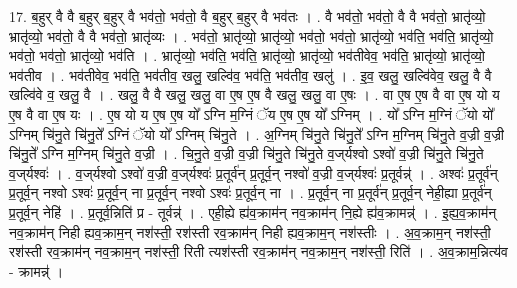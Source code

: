 \documentclass[17pt]{extarticle}
\begin{document}
17. ब॒हुर् वै वै ब॒हुर् ब॒हुर् वै भव॑तो॒ भव॑तो॒ वै ब॒हुर् ब॒हुर् वै भव॑तः । . वै भव॑तो॒ भव॑तो॒ वै वै भव॑तो॒ भ्रातृ॑व्यो॒ भ्रातृ॑व्यो॒ भव॑तो॒ वै वै भव॑तो॒ भ्रातृ॑व्यः । . भव॑तो॒ भ्रातृ॑व्यो॒ भ्रातृ॑व्यो॒ भव॑तो॒ भव॑तो॒ भ्रातृ॑व्यो॒ भव॑ति॒ भव॑ति॒ भ्रातृ॑व्यो॒ भव॑तो॒ भव॑तो॒ भ्रातृ॑व्यो॒ भव॑ति । . भ्रातृ॑व्यो॒ भव॑ति॒ भव॑ति॒ भ्रातृ॑व्यो॒ भ्रातृ॑व्यो॒ भव॑तीवेव॒ भव॑ति॒ भ्रातृ॑व्यो॒ भ्रातृ॑व्यो॒ भव॑तीव । . भव॑तीवेव॒ भव॑ति॒ भव॑तीव॒ खलु॒ खल्वि॑व॒ भव॑ति॒ भव॑तीव॒ खलु॑ । . इ॒व॒ खलु॒ खल्वि॑वेव॒ खलु॒ वै वै खल्वि॑वे व॒ खलु॒ वै । . खलु॒ वै वै खलु॒ खलु॒ वा ए॒ष ए॒ष वै खलु॒ खलु॒ वा ए॒षः । . वा ए॒ष ए॒ष वै वा ए॒ष यो य ए॒ष वै वा ए॒ष यः । . ए॒ष यो य ए॒ष ए॒ष यो᳚ ऽग्नि म॒ग्निं ॅय ए॒ष ए॒ष यो᳚ ऽग्निम् । . यो᳚ ऽग्नि म॒ग्निं ॅयो यो᳚ ऽग्निम् चि॑नु॒ते चि॑नु॒ते᳚ ऽग्निं ॅयो यो᳚ ऽग्निम् चि॑नु॒ते । . अ॒ग्निम् चि॑नु॒ते चि॑नु॒ते᳚ ऽग्नि म॒ग्निम् चि॑नु॒ते व॒ज्री व॒ज्री चि॑नु॒ते᳚ ऽग्नि म॒ग्निम् चि॑नु॒ते व॒ज्री । . चि॒नु॒ते व॒ज्री व॒ज्री चि॑नु॒ते चि॑नु॒ते व॒ज्‌र्यश्वो ऽश्वो॑ व॒ज्री चि॑नु॒ते चि॑नु॒ते व॒ज्‌र्यश्वः॑ । . व॒ज्‌र्यश्वो ऽश्वो॑ व॒ज्री व॒ज्‌र्यश्वः॑ प्र॒तूर्व॑न् प्र॒तूर्व॒न् नश्वो॑ व॒ज्री व॒ज्‌र्यश्वः॑ प्र॒तूर्वन्न्॑ । . अश्वः॑ प्र॒तूर्व॑न् प्र॒तूर्व॒न् नश्वो ऽश्वः॑ प्र॒तूर्व॒न् ना प्र॒तूर्व॒न् नश्वो ऽश्वः॑ प्र॒तूर्व॒न् ना । . प्र॒तूर्व॒न् ना प्र॒तूर्व॑न् प्र॒तूर्व॒न् नेही॒ह्या प्र॒तूर्व॑न् प्र॒तूर्व॒न् नेहि॑ । . प्र॒तूर्व॒न्निति॑ प्र - तूर्वन्न्॑ । . एही॒ह्ये ह्य॑व॒क्राम॑न् नव॒क्राम॑न् नि॒ह्ये ह्य॑व॒क्रामन्न्॑ । . इ॒ह्य॒व॒क्राम॑न् नव॒क्राम॑न् निही ह्यव॒क्राम॒न् नश॑स्ती॒ रश॑स्ती रव॒क्राम॑न् निही ह्यव॒क्राम॒न् नश॑स्तीः । . अ॒व॒क्राम॒न् नश॑स्ती॒ रश॑स्ती रव॒क्राम॑न् नव॒क्राम॒न् नश॑स्ती॒ रिती त्यश॑स्ती रव॒क्राम॑न् नव॒क्राम॒न् नश॑स्ती॒ रिति॑ । . अ॒व॒क्राम॒न्नित्य॑व - क्रामन्न्॑ । \newline
\end{document}
